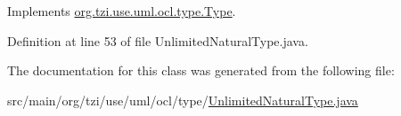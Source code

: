 Implements \hyperlink{interfaceorg_1_1tzi_1_1use_1_1uml_1_1ocl_1_1type_1_1_type_a500a259474d582f1f3b7f3b87cf0d547}{org.\-tzi.\-use.\-uml.\-ocl.\-type.\-Type}.



Definition at line 53 of file Unlimited\-Natural\-Type.\-java.



The documentation for this class was generated from the following file\-:\begin{DoxyCompactItemize}
\item 
src/main/org/tzi/use/uml/ocl/type/\hyperlink{_unlimited_natural_type_8java}{Unlimited\-Natural\-Type.\-java}\end{DoxyCompactItemize}
